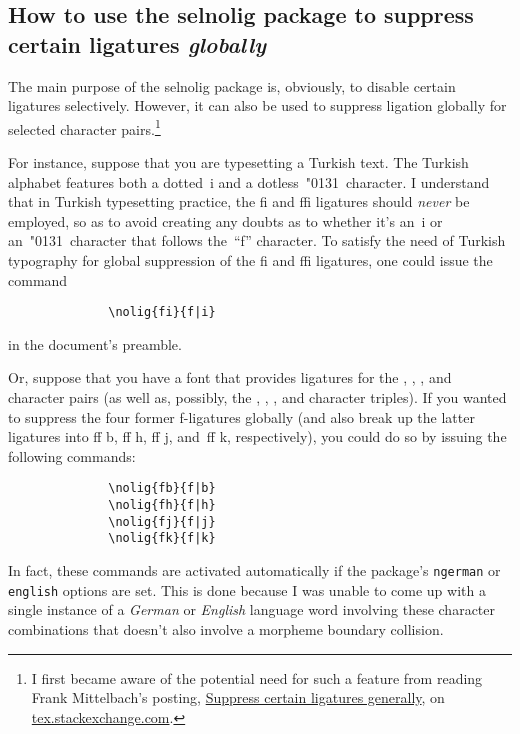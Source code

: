 \documentclass[11pt]{article}
\newcommand{\pkg}[1]{\textsf{#1}}
\newcommand{\opt}[1]{\texttt{#1}}
\begin{document}
\subsection[How to use the selnolig package to suppress certain ligatures globally]{How to use the \pkg{selnolig} package to suppress certain ligatures \emph{globally}}
\label{sec:global-nolig}


The main purpose of the \pkg{selnolig} package is, obviously, to disable certain ligatures selectively. However, it can also be used to suppress ligation globally for selected character pairs.\footnote{I first became aware of the potential need for such a feature from reading Frank Mittelbach's posting, \href{http://tex.stackexchange.com/q/61042/5001}{Suppress certain ligatures generally}, on \url{tex.stackexchange.com}. } 

For instance, suppose that you are typesetting a Turkish text. The Turkish alphabet features both a dotted~i and a dotless~\char"0131\ character. I understand that in Turkish typesetting practice, the fi and ffi ligatures should \emph{never} be employed, so as to avoid creating any doubts as to whether it's an~i or an~\char"0131\ character that follows the~\enquote{f} character. To satisfy the need of Turkish typography for global suppression of the fi and ffi ligatures, one could issue the command
\begin{Verbatim}
              \nolig{fi}{f|i}
\end{Verbatim}
in the document's preamble.


Or, suppose that you have a font that provides ligatures for the {\ebg {}, , ,} and {\ebg{}} character pairs (as well as, possibly, the {\ebg {}, , ,} and {\ebg{}} character triples). If you wanted to suppress the four former f-ligatures globally (and also break up the latter ligatures into ff\kern0pt b, ff\kern0pt h, ff\kern0pt j, and~ff\kern0pt k, respectively), you could do so by issuing the following commands: 
\begin{Verbatim}
              \nolig{fb}{f|b}
              \nolig{fh}{f|h}
              \nolig{fj}{f|j}
              \nolig{fk}{f|k}
\end{Verbatim}
In fact, these commands are activated automatically if the package's \opt{ngerman} or \opt{english} options are set. This is done because I was unable to come up with a single instance of a \emph{German} or \emph{English} language word involving these character combinations that doesn't also involve a morpheme boundary collision.
\end{document}
